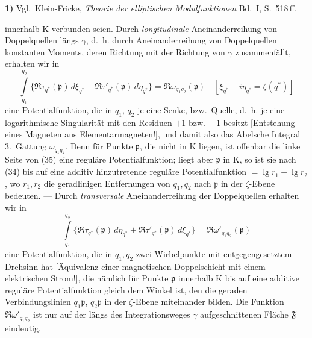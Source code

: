 \documentclass{article}
\begin{document}
\textbf{1)} Vgl.\ Klein-Fricke, \emph{Theorie der elliptischen Modulfunktionen} Bd.~I, S.~518\,ff.

innerhalb $\mathrm{K}$ verbunden seien. Durch \emph{longitudinale} Aneinanderreihung von Doppelquellen längs $\gamma$, d.~h. durch Aneinanderreihung von Doppelquellen konstanten Moments, deren Richtung mit der Richtung von $\gamma$ zusammenfällt, erhalten wir in
\[ \int\limits_{q_1}^{q_2} \{ \Re\tau_{q^*}(\mathfrak{p})\,d\xi_{q^*} - \Re\tau'_{q^*}(\mathfrak{p})\,d\eta_{q^*} \} = \Re\omega_{q_1 q_2}(\mathfrak{p}) \quad [\xi_{q^*} + i\eta_{q^*} = \zeta(q^*)] \tag{35} \]
eine Potentialfunktion, die in $q_1$, $q_2$ je eine Senke, bzw.\ Quelle, d.~h. je eine logarithmische Singularität mit den Residuen $+1$ bzw.\ $-1$ besitzt [Entstehung eines Magneten aus Elementarmagneten!], und damit also das Abelsche Integral 3.\ Gattung $\omega_{q_1 q_2}$. Denn für Punkte $\mathfrak{p}$, die nicht in $\mathrm{K}$ liegen, ist offenbar die linke Seite von (35) eine reguläre Potentialfunktion; liegt aber $\mathfrak{p}$ in $\mathrm{K}$, so ist sie nach (34) bis auf eine additiv hinzutretende reguläre Potentialfunktion $= \lg r_1 - \lg r_2$, wo $r_1, r_2$ die geradlinigen Entfernungen von $q_1, q_2$ nach $\mathfrak{p}$ in der $\zeta$-Ebene bedeuten. --- Durch \emph{transversale} Aneinanderreihung der Doppelquellen erhalten wir in
\[ \int\limits_{q_1}^{q_2} \{ \Re\tau_{q^*}(\mathfrak{p})\,d\eta_{q^*} + \Re\tau'_{q^*}(\mathfrak{p})\,d\xi_{q^*} \} = \Re\omega'_{q_1 q_2}(\mathfrak{p}) \tag{35'} \]
eine Potentialfunktion, die in $q_1, q_2$ zwei Wirbelpunkte mit entgegengesetztem Drehsinn hat [Äquivalenz einer magnetischen Doppelschicht mit einem elektrischen Strom!], die nämlich für Punkte $\mathfrak{p}$ innerhalb $\mathrm{K}$ bis auf eine additive reguläre Potentialfunktion gleich dem Winkel ist, den die geraden Verbindungslinien $q_1\mathfrak{p}$, $q_2\mathfrak{p}$ in der $\zeta$-Ebene miteinander bilden. Die Funktion $\Re\omega'_{q_1 q_2}$ ist nur auf der längs des Integrationsweges $\gamma$ aufgeschnittenen Fläche $\mathfrak{F}$ eindeutig.
\end{document}
